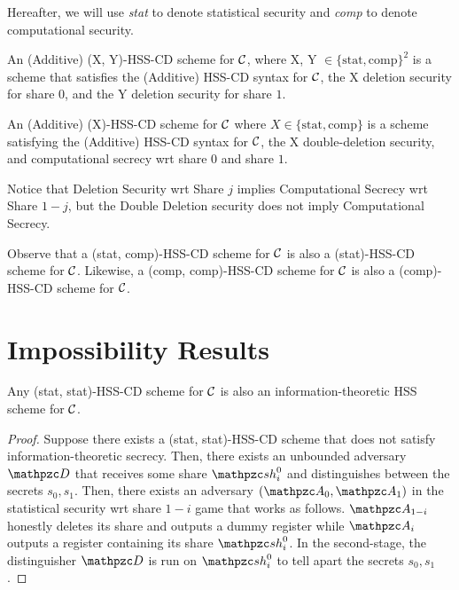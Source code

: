 Hereafter, we will use \emph{stat} to denote statistical
security and \emph{comp} to denote computational security.

\begin{definition}
An (Additive) (X, Y)-HSS-CD scheme for $\mathcal{C}$, where X, Y $\in
\{\textrm{stat},
\textrm{comp}\}^2$  is a scheme that satisfies the (Additive) HSS-CD
syntax for $\mathcal{C}$, the X deletion security for share $0$, and the
Y deletion security for share $1$.
\end{definition}

\begin{definition} An
(Additive) (X)-HSS-CD scheme for $\mathcal{C}$ where $X \in
\{\textrm{stat}, \textrm{comp}\}$ is a scheme satisfying the
(Additive) HSS-CD syntax for $\mathcal{C}$, the X double-deletion
security, and computational secrecy wrt share $0$ and share $1$.
\end{definition}

\begin{remark}
Notice that Deletion Security wrt Share
$j$ implies Computational Secrecy wrt Share $1-j$, but the Double
Deletion security does not imply Computational Secrecy.
\end{remark}

\begin{remark}
Observe that a (stat, comp)-HSS-CD scheme for $\mathcal{C}$ is also
a (stat)-HSS-CD scheme for $\mathcal{C}$. Likewise, a (comp,
comp)-HSS-CD scheme for $\mathcal{C}$ is also a (comp)-HSS-CD scheme for
$\mathcal{C}$.
\end{remark}

\section{Impossibility Results}

\begin{lemma}
Any (stat, stat)-HSS-CD scheme for $\cal{C}$ is also an
information-theoretic HSS scheme for $\mathcal{C}$.
\end{lemma}
\begin{proof}
Suppose there exists a (stat, stat)-HSS-CD scheme that does not
satisfy information-theoretic secrecy. Then, there exists an
unbounded adversary $\qD$ that receives some share $\qsh_i^0$ and
distinguishes between the secrets $s_0, s_1$. Then, there exists an
adversary $(\qA_0, \qA_1)$ in the statistical security wrt share
$1-i$ game that works as follows. $\qA_{1-i}$ honestly deletes its
share and outputs a dummy register while $\qA_i$ outputs a register
containing its share $\qsh_i^0$. In the second-stage, the
distinguisher $\qD$ is run on $\qsh_i^0$ to tell apart the secrets
$s_0, s_1$.
\end{proof}

